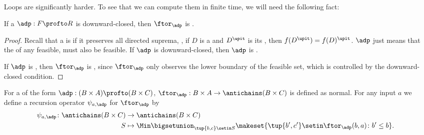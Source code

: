 Loops are significantly harder.
To see that we can compute them in finite time, we will need the following fact:
\begin{lemma}
    If a  $\adp : F \profto R$ is downward-closed, then $\ftor_\adp$ is .
\end{lemma}

\begin{proof}
    Recall that a  is  if it preserves all directed suprema, \ie,  if $D$ is a  and $D^\upit$ is its , then $f(D^\upit) = f(D)^\upit$.
    $\adp$  just means that the  of any feasible,  must also be feasible.
    If $\adp$ is downward-closed, then $\adp$ is .


    If $\adp$ is , then $\ftor_\adp$ is , since $\ftor_\adp$ only observes the lower boundary of the feasible set, which is controlled by the downward-closed condition.
\end{proof}

For a  of the form $\adp : (B \times A) \profto (B \times C)$, $\ftor_\adp : B \times A \to \antichains (B \times C)$ is defined as normal.
For any input $a$ we define a recursion operator $\psi_{a,\adp}$ for $\ftor_\adp$ by
\begin{equation}
    \begin{aligned}
        \psi_{a,\adp} \colon \antichains (B \times C) & \to \antichains (B \times C) \\
        S                                             & \mapsto \Min \bigsetunion_{\tup{b,c} \setin S} \makeset{ \tup{b',c'} \setin \ftor_\adp(b,a) \colon b' \leq b }.
    \end{aligned}
\end{equation}

